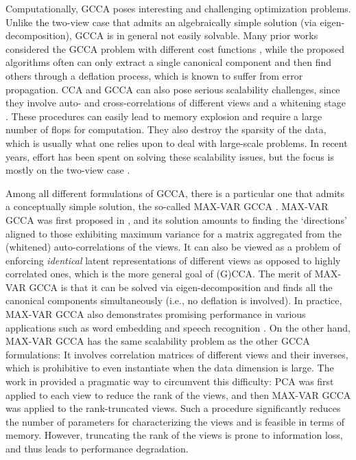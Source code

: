 \documentclass[10pt,journal]{IEEEtran}
\begin{document}
Computationally, GCCA poses interesting and challenging optimization problems.
Unlike the two-view case that admits an algebraically simple solution (via eigen-decomposition),
GCCA is in general not easily solvable.
Many prior works considered the GCCA problem with different cost functions \cite{carroll1968generalization,kettenring1971canonical}, while the proposed algorithms often can only extract a single canonical component and then find others through a deflation process, which is known to suffer from error propagation.
CCA and GCCA can also pose serious scalability challenges,
since they involve auto- and cross-correlations of different views and a whitening stage \cite{ma2015finding}.
These procedures can easily lead to memory explosion and require a large number of flops for computation.
They also destroy the sparsity of the data, which is usually what one relies upon to deal with large-scale problems.
In recent years, effort has been spent on solving these scalability issues, but the focus is mostly on the two-view case \cite{ma2015finding,sun2011canonical,lu2014large}.



Among all different formulations of GCCA, there is a particular one that admits a conceptually simple solution, the so-called MAX-VAR GCCA \cite{carroll1968generalization,van2006generalized,kettenring1971canonical}.
MAX-VAR GCCA was first proposed in \cite{carroll1968generalization}, and its solution amounts to finding the `directions' aligned to those exhibiting maximum variance for a matrix aggregated from the (whitened) auto-correlations of the views.
It can also be viewed as a problem of enforcing {\em identical} latent representations of different views as opposed to highly correlated ones, which is the more general goal of (G)CCA.
The merit of MAX-VAR GCCA is that it can be solved via eigen-decomposition and finds all the canonical components simultaneously (i.e., no deflation is involved).
In practice, MAX-VAR GCCA also demonstrates promising performance in various applications such as word embedding \cite{rastogimultiview} and speech recognition \cite{arora2014multi}.
On the other hand, MAX-VAR GCCA has the same scalability problem as the other GCCA formulations:
It involves correlation matrices of different views and their inverses, which is prohibitive to even instantiate when the data dimension is large.
The work in \cite{rastogimultiview} provided a pragmatic way to circumvent this difficulty: PCA was first applied to each view to reduce the rank of the views,
and then MAX-VAR GCCA was applied to the rank-truncated views. Such a procedure significantly reduces
the number of parameters for characterizing the views and is feasible in terms of memory. However, truncating the rank of the views is prone to information loss, and thus leads to performance degradation.
\end{document}
